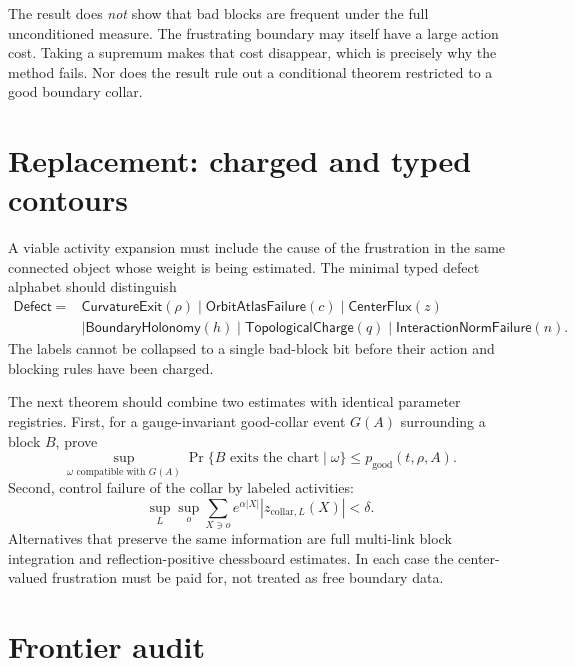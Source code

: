 \documentclass[11pt]{article}
\theoremstyle{definition}
\begin{document}
The result does \emph{not} show that bad blocks are frequent under the full
unconditioned measure.  The frustrating boundary may itself have a large
action cost.  Taking a supremum makes that cost disappear, which is precisely
why the method fails.  Nor does the result rule out a conditional theorem
restricted to a good boundary collar.

\section{Replacement: charged and typed contours}\label{sec:replacement}

A viable activity expansion must include the cause of the frustration in the
same connected object whose weight is being estimated.  The minimal typed
defect alphabet should distinguish
\[
 \begin{split}
 \mathsf{Defect}={}&\mathsf{CurvatureExit}(\rho)
 \mid\mathsf{OrbitAtlasFailure}(c)
 \mid\mathsf{CenterFlux}(z)\\
 &\mid\mathsf{BoundaryHolonomy}(h)
 \mid\mathsf{TopologicalCharge}(q)
 \mid\mathsf{InteractionNormFailure}(n).
 \end{split}
\]
The labels cannot be collapsed to a single bad-block bit before their action
and blocking rules have been charged.

The next theorem should combine two estimates with identical parameter
registries.  First, for a gauge-invariant good-collar event $G(A)$ surrounding
a block $B$, prove
\begin{equation}\label{eq:collar}
 \sup_{\omega\text{ compatible with }G(A)}
 \Pr\{B\text{ exits the chart}\mid\omega\}
 \le p_{\mathrm{good}}(t,\rho,A).
\end{equation}
Second, control failure of the collar by labeled activities:
\begin{equation}\label{eq:activity}
 \sup_L\sup_o\sum_{X\ni o}
 e^{\alpha|X|}|z_{\mathrm{collar},L}(X)|<\delta.
\end{equation}
Alternatives that preserve the same information are full multi-link block
integration and reflection-positive chessboard estimates.  In each case the
center-valued frustration must be paid for, not treated as free boundary data.

\section{Frontier audit}
\end{document}

